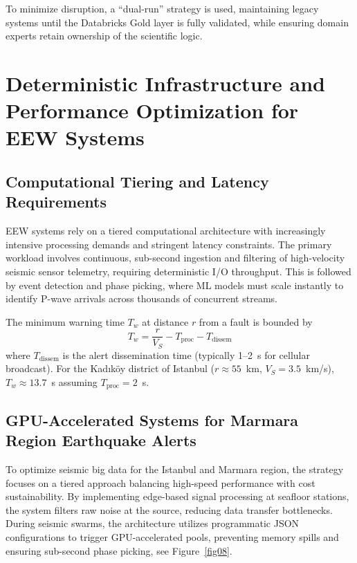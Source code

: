\documentclass[data,article,accept,pdftex,moreauthors]{Definitions/mdpi}
\begin{document}
To minimize disruption, a ``dual-run'' strategy is used, maintaining legacy systems until the Databricks Gold layer is fully validated, while ensuring domain experts retain ownership of the scientific logic.

\section{Deterministic Infrastructure and Performance Optimization for \linebreak EEW Systems}

\subsection{Computational Tiering and Latency Requirements}

EEW systems rely on a tiered computational architecture with increasingly intensive processing demands and stringent latency constraints. The primary workload involves continuous, sub-second ingestion and filtering of high-velocity seismic sensor telemetry, requiring deterministic I/O throughput. This is followed by event detection and phase picking, where ML models must scale instantly to identify P-wave arrivals across thousands of concurrent streams.

The minimum warning time $T_w$ at distance $r$ from a fault is bounded by
\begin{equation}
T_w = \frac{r}{V_S} - T_{\text{proc}} - T_{\text{dissem}}
\end{equation}
where $T_{\text{dissem}}$ is the alert dissemination time (typically 1--2~s for cellular broadcast). For the Kadıköy district of Istanbul ($r \approx 55$~km, $V_S = 3.5$~km/s), $T_w \approx 13.7$~s assuming $T_{\text{proc}} = 2$~s.

\subsection{GPU-Accelerated Systems for Marmara Region Earthquake Alerts}

To optimize seismic big data for the Istanbul and Marmara region, the strategy focuses on a tiered approach balancing high-speed performance with cost sustainability. By implementing edge-based signal processing at seafloor stations, the system filters raw noise at the source, reducing data transfer bottlenecks. During seismic swarms, the architecture utilizes programmatic JSON configurations to trigger GPU-accelerated pools, preventing memory spills and ensuring sub-second phase picking, see Figure~\ref{fig08}.
\end{document}
